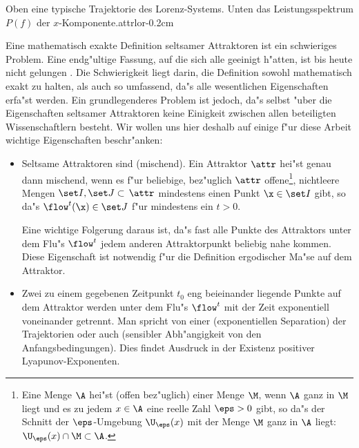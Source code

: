 {Oben eine typische Trajektorie des Lorenz-Systems. Unten das Leistungsspektrum $P(f)$ der
  $x$-Komponente.}{attrlor}{-0.2cm} 

Eine mathematisch exakte Definition seltsamer Attraktoren ist ein schwieriges
Problem. Eine endg"ultige Fassung, auf die sich alle geeinigt h"atten, ist bis heute nicht
gelungen \cite{Pawelzik91}. Die Schwierigkeit liegt darin, die Definition sowohl
mathematisch exakt zu halten, als auch so umfassend, da"s alle wesentlichen Eigenschaften
erfa"st werden. Ein grundlegenderes Problem ist jedoch, da"s selbst "uber die
Eigenschaften seltsamer Attraktoren keine Einigkeit zwischen allen beteiligten Wissenschaftlern
besteht. Wir wollen uns hier deshalb auf einige f"ur diese 
Arbeit wichtige Eigenschaften beschr"anken:
\begin{itemize}
\item Seltsame Attraktoren sind \begriff(mischend).  Ein Attraktor $\attr$ hei"st genau
  dann mischend, wenn es f"ur beliebige, bez"uglich $\attr$ offene\footnote{Eine Menge
    $\A$ hei"st \begriff(offen bez"uglich) einer Menge $\M$, wenn $\A$ ganz in $\M$ liegt
    und es zu jedem $x\in\A$ eine reelle Zahl $\eps>0$ gibt, so da"s der Schnitt der
    $\eps$-Umgebung $\U_\eps(x)$ mit der Menge $\M$ ganz in $\A$ liegt: $\U_\eps(x) \cap
    \M \subset \A$.  }, nichtleere Mengen $\set I,\set J\subset\,\attr$ mindestens einen
  Punkt $\x\in\set I$ gibt, so da"s $\flow^t(\x)\in\set J$ f"ur mindestens ein $t>0$.


Eine wichtige Folgerung daraus ist, da"s fast alle Punkte
des Attraktors unter dem Flu"s $\flow^t$ jedem anderen Attraktorpunkt beliebig nahe
kommen. Diese Eigenschaft ist notwendig f"ur die Definition ergodischer Ma"se
auf dem Attraktor. 

\item Zwei zu einem gegebenen Zeitpunkt $t_0$ eng beieinander liegende Punkte auf dem Attraktor
werden unter dem Flu"s $\flow^t$ mit der Zeit exponentiell voneinander getrennt. Man spricht von einer 
\begriff(exponentiellen Separation) der Trajektorien oder auch \begriff(sensibler
Abh"angigkeit von den Anfangsbedingungen). Dies findet Ausdruck in der Existenz positiver
Lyapunov-Exponenten.


\end{itemize}
